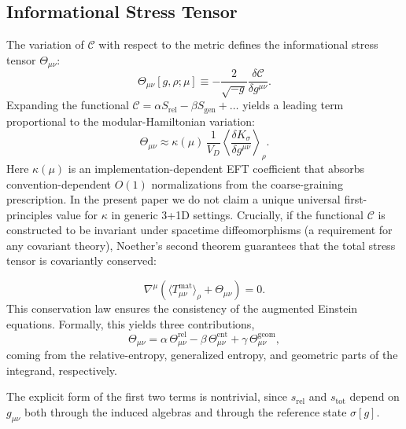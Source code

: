 \documentclass[aps,prd,twocolumn,superscriptaddress,nofootinbib,floatfix]{revtex4-2}
\newcommand{\Cfunc}{\mathcal{C}}
\newcommand{\sg}{\sigma[g]}
\newcommand{\Tmn}{\Theta_{\mu\nu}}
\newcommand{\sr}{s_{\mathrm{rel}}}
\newcommand{\stot}{s_{\mathrm{tot}}}
\begin{document}
\subsection{Informational Stress Tensor}
The variation of $\Cfunc$ with respect to the metric defines the informational stress tensor $\Tmn$:
\begin{equation}
    \Tmn[g,\rho;\mu] \equiv -\frac{2}{\sqrt{-g}} \frac{\delta \Cfunc}{\delta g^{\mu\nu}}.
\end{equation}
Expanding the functional $\Cfunc = \alpha S_{\mathrm{rel}} - \beta S_{\mathrm{gen}} + \dots$ yields a leading term proportional to the modular-Hamiltonian variation:
\begin{equation}
    \Tmn \approx \kappa(\mu)\,\frac{1}{V_D} \left\langle \frac{\delta K_\sigma}{\delta g^{\mu\nu}} \right\rangle_\rho.
\end{equation}
Here $\kappa(\mu)$ is an implementation-dependent EFT coefficient that absorbs convention-dependent $O(1)$ normalizations from the coarse-graining prescription. In the present paper we do not claim a unique universal first-principles value for $\kappa$ in generic 3+1D settings.
Crucially, if the functional $\Cfunc$ is constructed to be invariant under spacetime diffeomorphisms (a requirement for any covariant theory), Noether's second theorem guarantees that the total stress tensor is covariantly conserved:

\begin{equation}
    \nabla^\mu \left( \langle T_{\mu\nu}^{\mathrm{mat}} \rangle_\rho + \Tmn \right) = 0.
\end{equation}
This conservation law ensures the consistency of the augmented Einstein equations.
Formally, this yields three contributions,
\begin{equation}
    \Tmn
    =
    \alpha\,\Tmn^{\mathrm{rel}}
    - \beta\,\Tmn^{\mathrm{ent}}
    + \gamma\,\Tmn^{\mathrm{geom}},
    \label{eq:theta-decomp}
\end{equation}
coming from the relative-entropy, generalized entropy, and geometric parts of the integrand, respectively.

The explicit form of the first two terms is nontrivial, since $\sr$ and $\stot$ depend on $g_{\mu\nu}$ both through the induced algebras and through the reference state $\sg$.
\end{document}
